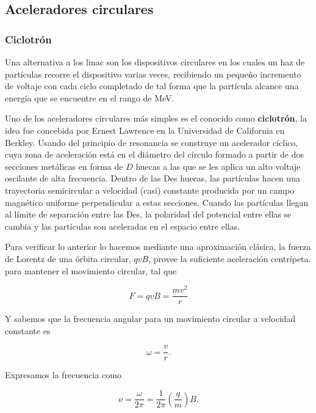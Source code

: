 \documentclass[12pt]{article}
\theoremstyle{break}
\theoremstyle{nonumberbreak}
\begin{document}
    \subsection{Aceleradores circulares}

    \subsubsection{Ciclotrón}

    Una alternativa a los linac son los dispositivos circulares en los cuales un haz de partículas recorre el dispositivo varias veces, recibiendo un pequeño incremento de voltaje con cada ciclo completado de tal forma que la partícula alcance una energía que se encuentre en el rango de \unit{\MeV}.

    Uno de los aceleradores circulares más simples es el conocido como \textbf{ciclotrón}, la idea fue concebida por Ernest Lawrence en la Universidad de California en Berkley. Usando del principio de resonancia se construye un acelerador cíclico, cuya zona de aceleración está en el diámetro del círculo formado a partir de dos secciones metálicas en forma de \(D\) huecas a las que se les aplica un alto voltaje oscilante de alta frecuencia. Dentro de las Des huecas, las partículas hacen una trayectoria semicircular a velocidad (casi) constante producida por un campo magnético uniforme perpendicular a estas secciones. Cuando las partículas llegan al límite de separación entre las Des, la polaridad del potencial entre ellas se cambia y las partículas son aceleradas en el espacio entre ellas.

    Para verificar lo anterior lo hacemos mediante una aproximación clásica, la fuerza de Lorentz de una órbita circular, \(qvB\),  provee la suficiente aceleración centrípeta. para mantener el movimiento circular, tal que

    \begin{equation*}
      F = qvB = \dfrac{mv^{2}}{r}
    \end{equation*}

    Y sabemos que la frecuencia angular para un movimiento circular a velocidad constante es

    \begin{equation*}
      \omega = \dfrac{v}{r}.
    \end{equation*}

    Expresamos la frecuencia como

    \begin{equation*}
      \nu = \dfrac{\omega}{2\pi} = \dfrac{1}{2\pi}\left(\dfrac{q}{m}\right)B.
    \end{equation*}
\end{document}
